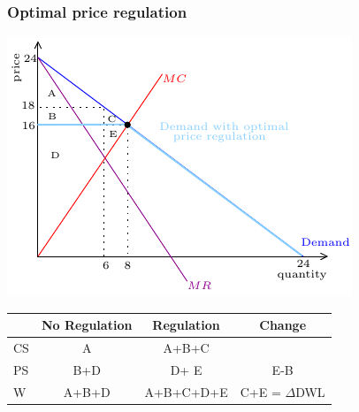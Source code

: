 \documentclass[xcolor=pdftex,dvipsnames]{beamer}
\begin{document}
\begin{frame}
  \frametitle{Optimal price regulation}
  \begin{center}
    \includegraphics{pics/OptReg2}

  {\scriptsize
    \begin{tabular}{lccc}
\hline      & No Regulation & Regulation & Change\\
\hline      CS & A&{\color{white}A+B+C} &{\color{white}{B+C}}\\
\hline      PS & B+D  & {\color{white}D+ E} &  {\color{white}E-B} \\
\hline      W & A+B+D &  {\color{white}A+B+C+D+E} &  {\color{white}C+E = $\Delta$DWL}\\\hline
    \end{tabular}
  }
  \end{center}
\end{frame}
\end{document}
